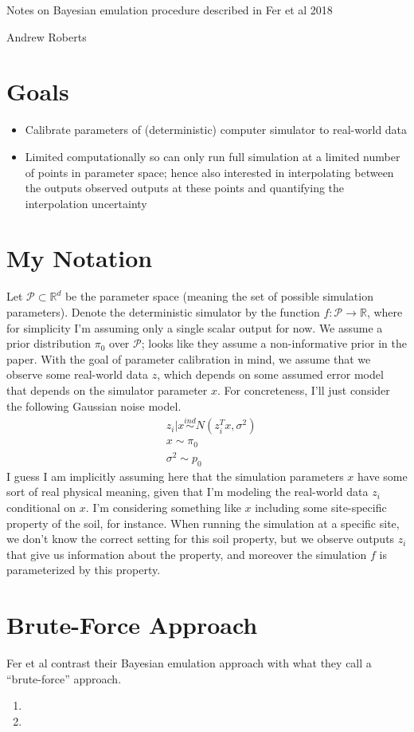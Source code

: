 \documentclass[12pt]{article}
\newcommand{\R}{\mathcal{R}}
\def\R{\mathbb{R}}
\begin{document}
\begin{center}
\Large
Notes on Bayesian emulation procedure described in Fer et al 2018
\end{center}

\begin{flushright}
Andrew Roberts
\end{flushright} 

\section{Goals}
\begin{itemize}
\item Calibrate parameters of (deterministic) computer simulator to real-world data
\item Limited computationally so can only run full simulation at a limited number of points in parameter space; hence also interested in interpolating between the 
outputs observed outputs at these points and quantifying the interpolation uncertainty
\end{itemize}

\section{My Notation}
Let $\mathcal{P} \subset \R^d$ be the parameter space (meaning the set of possible simulation parameters). Denote the deterministic simulator by the function $f: \mathcal{P} \to \R$, 
where for simplicity I'm assuming only a single scalar output for now. We assume a prior distribution $\pi_0$ over $\mathcal{P}$; looks like they assume a non-informative prior in the paper. 
With the goal of parameter calibration in mind, we assume that we observe some real-world data $z$, which depends on some assumed error model that depends on the simulator parameter
$x$. For concreteness, I'll just consider the following Gaussian noise model. 
\begin{align*}
&z_i|x \overset{ind}{\sim} N(z_i^T x, \sigma^2) \\
&x \sim \pi_0 \\
&\sigma^2 \sim p_0
\end{align*}
I guess I am implicitly assuming here that the simulation parameters $x$ have some sort of real physical meaning, given that I'm modeling the real-world data $z_i$ conditional on $x$. 
I'm considering something like $x$ including some site-specific property of the soil, for instance. When running the simulation at a specific site, we don't know the correct setting for this soil 
property, but we observe outputs $z_i$ that give us information about the property, and moreover the simulation $f$ is parameterized by this property.  


\section{Brute-Force Approach}
Fer et al contrast their Bayesian emulation approach with what they call a ``brute-force'' approach.
\begin{enumerate}
\item 
\item 
\end{enumerate}
\end{document}

